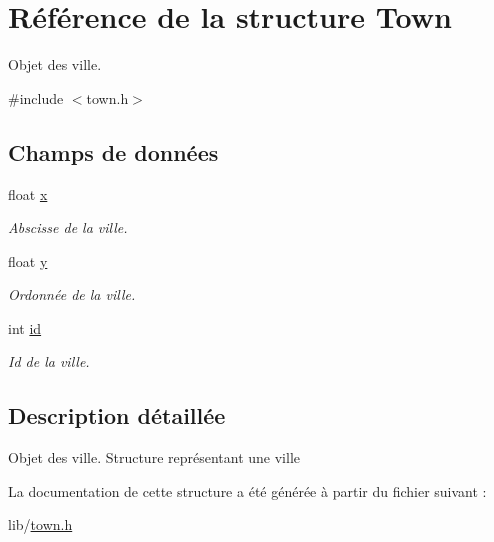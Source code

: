\hypertarget{structTown}{
\section{Référence de la structure Town}
\label{structTown}
}


Objet des ville.  




{\ttfamily \#include $<$town.h$>$}

\subsection*{Champs de données}
\begin{DoxyCompactItemize}
\item 
\hypertarget{structTown_aecb205f10cdf492d5424da30d5f634e5}{
float \hyperlink{structTown_aecb205f10cdf492d5424da30d5f634e5}{x}}
\label{structTown_aecb205f10cdf492d5424da30d5f634e5}

\begin{DoxyCompactList}\small\item\em Abscisse de la ville. \item\end{DoxyCompactList}\item 
\hypertarget{structTown_a3af0bab3c9251c26686fa39d28a0ee99}{
float \hyperlink{structTown_a3af0bab3c9251c26686fa39d28a0ee99}{y}}
\label{structTown_a3af0bab3c9251c26686fa39d28a0ee99}

\begin{DoxyCompactList}\small\item\em Ordonnée de la ville. \item\end{DoxyCompactList}\item 
\hypertarget{structTown_a3fd25ddbb4f43f39fb8ccd507c8b8b2b}{
int \hyperlink{structTown_a3fd25ddbb4f43f39fb8ccd507c8b8b2b}{id}}
\label{structTown_a3fd25ddbb4f43f39fb8ccd507c8b8b2b}

\begin{DoxyCompactList}\small\item\em Id de la ville. \item\end{DoxyCompactList}\end{DoxyCompactItemize}


\subsection{Description détaillée}
Objet des ville. Structure représentant une ville 

La documentation de cette structure a été générée à partir du fichier suivant :\begin{DoxyCompactItemize}
\item 
lib/\hyperlink{town_8h}{town.h}\end{DoxyCompactItemize}
